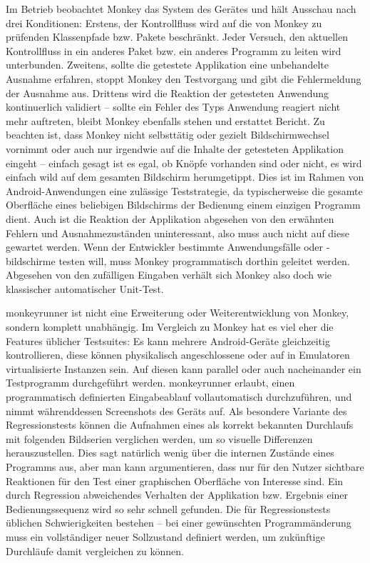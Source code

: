 Im Betrieb beobachtet Monkey das System
des Gerätes und hält Ausschau nach drei Konditionen: Erstens, der
Kontrollfluss wird auf die von Monkey zu prüfenden Klassenpfade bzw.
Pakete beschränkt. Jeder Versuch, den aktuellen Kontrollfluss in ein
anderes Paket bzw. ein anderes Programm zu leiten wird unterbunden.
Zweitens, sollte die getestete Applikation eine unbehandelte Ausnahme
erfahren, stoppt Monkey den Testvorgang und gibt die Fehlermeldung der
Ausnahme aus. Drittens wird die Reaktion der getesteten Anwendung
kontinuerlich validiert -- sollte ein Fehler des Typs \glqq{}Anwendung
reagiert nicht mehr\grqq{} auftreten, bleibt Monkey ebenfalls stehen
und erstattet Bericht. Zu beachten ist, dass Monkey nicht selbsttätig
oder gezielt Bildschirmwechsel vornimmt oder auch nur irgendwie
auf die Inhalte der getesteten Applikation eingeht -- einfach gesagt ist es egal,
ob Knöpfe vorhanden sind oder nicht, es wird einfach wild auf dem
gesamten Bildschirm herumgetippt. Dies ist im Rahmen von Android-Anwendungen
eine zulässige Teststrategie, da typischerweise die gesamte Oberfläche
eines beliebigen Bildschirms der Bedienung einem einzigen Programm dient.
Auch ist die Reaktion der Applikation abgesehen von den erwähnten
Fehlern und Ausnahmezuständen uninteressant, also muss auch nicht auf
diese gewartet werden. Wenn der Entwickler bestimmte Anwendungsfälle
oder -bildschirme testen will, muss Monkey programmatisch dorthin
geleitet werden. Abgesehen von den zufälligen Eingaben verhält sich
Monkey also doch wie klassischer automatischer Unit-Test.

monkeyrunner ist nicht eine Erweiterung oder Weiterentwicklung von Monkey,
sondern komplett unabhängig. Im Vergleich zu Monkey hat es viel eher die
Features üblicher Testsuites: Es kann mehrere Android-Geräte
gleichzeitig kontrollieren, diese können physikalisch angeschlossene oder
auf in Emulatoren virtualisierte Instanzen sein. Auf diesen kann parallel
oder auch nacheinander ein Testprogramm durchgeführt werden. monkeyrunner
erlaubt, einen programmatisch definierten Eingabeablauf vollautomatisch
durchzuführen, und nimmt währenddessen Screenshots des Geräts auf.
Als besondere Variante des Regressionstests können die Aufnahmen eines
als \glqq{}korrekt\grqq{} bekannten Durchlaufs mit folgenden Bildserien
verglichen werden, um so visuelle Differenzen herauszustellen. Dies sagt
natürlich wenig über die internen Zustände eines Programms aus, aber
man kann argumentieren, dass nur für den Nutzer sichtbare Reaktionen
für den Test einer graphischen Oberfläche von Interesse sind. Ein durch
Regression abweichendes Verhalten der Applikation bzw. Ergebnis einer
Bedienungssequenz wird so sehr schnell gefunden. Die für Regressionstests
üblichen Schwierigkeiten bestehen -- bei einer gewünschten Programmänderung
muss ein vollständiger neuer Sollzustand definiert werden, um zukünftige
Durchläufe damit vergleichen zu können.

